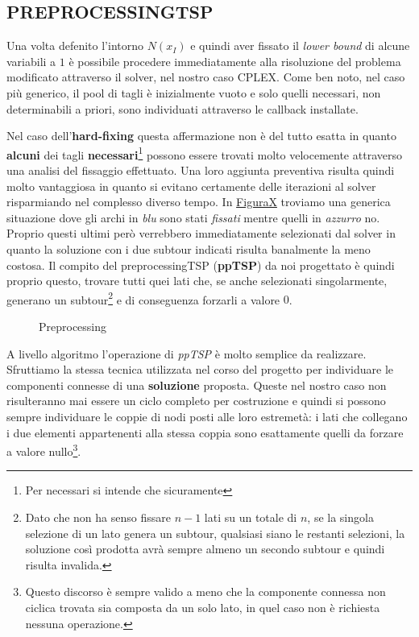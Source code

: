 \documentclass[11pt]{article}
\begin{document}
\subsection*{PREPROCESSINGTSP}
\label{sec:PreProcessingTSPS}

Una volta defenito l'intorno \textbf{$N(x_I)$} e quindi aver fissato il \textit{lower bound} di alcune variabili a $1$ è possibile procedere immediatamente alla risoluzione del problema modificato attraverso il solver, nel nostro caso CPLEX. Come ben noto, nel caso più generico, il pool di tagli è inizialmente vuoto e solo quelli necessari, non determinabili a priori, sono individuati attraverso le callback installate.

Nel caso dell'\textbf{hard-fixing} questa affermazione non è del tutto esatta in quanto \textbf{alcuni} dei tagli \textbf{necessari}\footnote{Per necessari si intende che sicuramente } possono essere trovati molto velocemente attraverso una analisi del fissaggio effettuato. Una loro aggiunta preventiva risulta quindi molto vantaggiosa in quanto si evitano certamente delle iterazioni al solver risparmiando nel complesso diverso tempo.
In \hyperref[fig:Preprocessiong1]{FiguraX} troviamo una generica situazione dove gli archi in \textit{blu} sono stati \textit{fissati} mentre quelli in \textit{azzurro} no. Proprio questi ultimi però verrebbero immediatamente selezionati dal solver in quanto la soluzione con i due subtour indicati risulta banalmente la meno costosa. Il compito del preprocessingTSP (\textbf{ppTSP}) da noi progettato è quindi proprio questo, trovare tutti quei lati che, se anche selezionati singolarmente, generano un subtour\footnote{Dato che non ha senso fissare $n-1$ lati su un totale di $n$, se la singola selezione di un lato genera un subtour, qualsiasi siano le restanti selezioni, la soluzione così prodotta avrà sempre almeno un secondo subtour e quindi risulta invalida.} e di conseguenza forzarli a valore $0$.

\begin{figure}[htbp]
    \centering
    \label{fig:Preprocessiong1}
    \caption{Preprocessing}
\end{figure}

A livello algoritmo l'operazione di \textit{ppTSP} è molto semplice da realizzare. Sfruttiamo la stessa tecnica utilizzata nel corso del progetto per individuare le componenti connesse di una \textbf{soluzione} proposta. Queste nel nostro caso non risulteranno mai essere un ciclo completo per costruzione e quindi si possono sempre individuare le coppie di nodi posti alle loro estremetà: i lati che collegano i due elementi appartenenti alla stessa coppia sono esattamente quelli da forzare a valore nullo\footnote{Questo discorso è sempre valido a meno che la componente connessa non ciclica trovata sia composta da un solo lato, in quel caso non è richiesta nessuna operazione.}.
\end{document}
